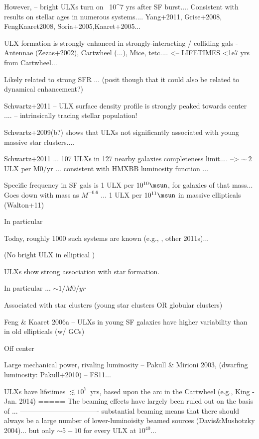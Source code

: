 However, \citet{Schwartz_2009} -- bright ULXs turn on ~10^7 yrs after SF burst.... Consistent with results on stellar ages in numerous systems....  Yang+2011, Grise+2008, FengKaaret2008, Soria+2005,Kaaret+2005...

ULX formation is strongly enhanced in strongly-interacting / colliding gals - Antennae (Zezas+2002), Cartwheel (...), Mice, tetc....    <-- LIFETIMES <1e7 yrs  from Cartwheel...

Likely related to strong SFR ... (posit though that it could also be related to dynamical enhancement?)


Schwartz+2011 -- ULX surface density profile is strongly peaked towards center .... -- intrinsically tracing stellar population!

Schwartz+2009(b?) shows that ULXs not significantly associated with young massive star clusters....

Schwartz+2011 ... 107 ULXs in 127 nearby galaxies completeness limit.... -->  $\sim~2$ ULX per  M0/yr  ... consistent with HMXBB luminosity function ...

Specific frequency in SF gals is 1 ULX per $10^{10} \msun$, for galaxies of that mass...  Goes down with mass as $M^{-0.6}$ ...   1 ULX per $10^{11} \msun$ in massive ellipticals (Walton+11)






In particular




Today, roughly 1000 such systems are known (e.g., \citep{Walton_2011}, other 2011s)...

(No bright ULX in elliptical )

ULXs show strong association with star formation.  

In particular ...
$\sim 1 / M0/yr$


Associated with star clusters (young star clusters OR globular clusters)

Feng & Kaaret 2006a -- ULXs in young SF galaxies have higher variability than in old ellipticals (w/ GCs)

Off center

Large mechanical power, rivaling luminosity -- Pakull & Mirioni 2003, (dwarfing luminosity: Pakull+2010) -- FS11...  

ULXs have lifetimes $\lesssim 10^7$~yrs, based upon the arc in the Cartwheel (e.g., King - Jan. 2014)
=====
The beaming effects have largely been ruled out on the basis of ...  
----------------------------------
substantial beaming means that there should always be a large number of lower-luminoisity beamed sources (Davis\&Mushotzky 2004)... but only $\sim5-10$ for every ULX at $10^{40}$...  

